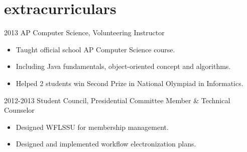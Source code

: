 \documentclass[]{friggeri-cv} %
\newenvironment{citemize}{\begin{itemize}[leftmargin=12pt]\vspace{-10pt}}{\end{itemize}}
\begin{document}

\section{extracurriculars}

\begin{entrylist}
  \entry
  {2013}
  {AP Computer Science, Volunteering Instructor}
  {}
  {\begin{citemize}
    \item{Taught official school AP Computer Science course. }
    \item{Including Java fundamentals, object-oriented concept and algorithms. }
    \item{Helped 2 students win Second Prize in National Olympiad in Informatics. }
  \end{citemize}}
  \entry
  {2012-2013}
  {Student Council, Presidential Committee Member \& Technical Counselor}
  {}
  {\begin{citemize}
      \item{Designed WFLSSU for membership management. }
      \item{Designed and implemented workflow electronization plans. }
    \end{citemize}}
\end{entrylist}
\end{document}

